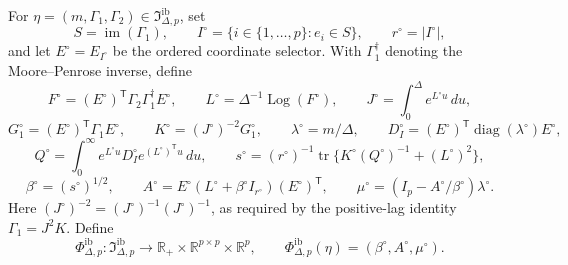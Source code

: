For \(\eta=(m,\Gamma_1,\Gamma_2)\in\mathfrak I_{\Delta,p}^{\mathrm{ib}}\), set
\[
 S=\operatorname{im}(\Gamma_1),\qquad
 I^\circ=\{i\in\{1,\ldots,p\}:e_i\in S\},\qquad
 r^\circ=|I^\circ|,
\]
and let \(E^\circ=E_{I^\circ}\) be the ordered coordinate selector.  With \(\Gamma_1^\dagger\) denoting the Moore--Penrose inverse, define
\[
 F^\circ=(E^\circ)^{\mathsf T}\Gamma_2\Gamma_1^\dagger E^\circ,\qquad
 L^\circ=\Delta^{-1}\operatorname{Log}(F^\circ),\qquad
 J^\circ=\int_0^\Delta e^{L^\circ u}\,du,
\]
\[
 G_1^\circ=(E^\circ)^{\mathsf T}\Gamma_1E^\circ,\qquad
 K^\circ=(J^\circ)^{-2}G_1^\circ,\qquad
 \lambda^\circ=m/\Delta,\qquad
 D_I^\circ=(E^\circ)^{\mathsf T}\operatorname{diag}(\lambda^\circ)E^\circ,
\]
\[
 Q^\circ=\int_0^\infty e^{L^\circ u}D_I^\circ e^{(L^\circ)^{\mathsf T}u}\,du,\qquad
 s^\circ=(r^\circ)^{-1}\operatorname{tr}\{K^\circ(Q^\circ)^{-1}+(L^\circ)^2\},
\]
\[
 \beta^\circ=(s^\circ)^{1/2},\qquad
 A^\circ=E^\circ(L^\circ+\beta^\circ I_{r^\circ})(E^\circ)^{\mathsf T},\qquad
 \mu^\circ=(I_p-A^\circ/\beta^\circ)\lambda^\circ.
\]
Here \((J^\circ)^{-2}=(J^\circ)^{-1}(J^\circ)^{-1}\), as required by the positive-lag identity \(\Gamma_1=J^2K\).  Define
\[
 \Phi_{\Delta,p}^{\mathrm{ib}}:\mathfrak I_{\Delta,p}^{\mathrm{ib}}
 \longrightarrow\mathbb R_+\times\mathbb R^{p\times p}\times\mathbb R^p,
 \qquad
 \Phi_{\Delta,p}^{\mathrm{ib}}(\eta)=(\beta^\circ,A^\circ,\mu^\circ).
\]